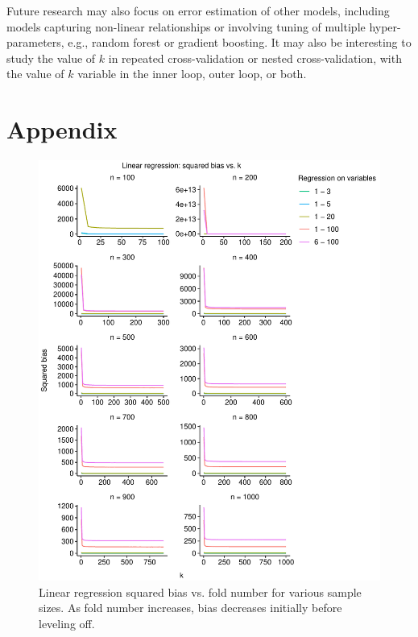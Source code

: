 \documentclass[
  12pt,
]{article}
\begin{document}
Future research may also focus on error estimation of other models,
including models capturing non-linear relationships or involving tuning
of multiple hyper-parameters, e.g., random forest or gradient boosting.
It may also be interesting to study the value of \(k\) in repeated
cross-validation or nested cross-validation, with the value of \(k\)
variable in the inner loop, outer loop, or both.

\hypertarget{appendix}{%
\section{Appendix}\label{appendix}}

\begin{figure}[H]

{\centering \includegraphics{manuscript_files/figure-latex/unnamed-chunk-1-1} 

}

\caption{Linear regression squared bias vs. fold number for various sample sizes. As fold number increases, bias decreases initially before leveling off.}\label{fig:unnamed-chunk-1}
\end{figure}
\end{document}
